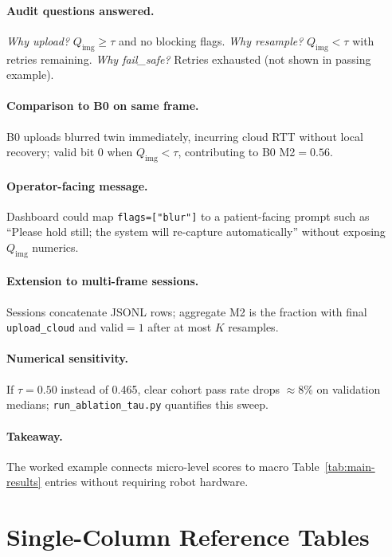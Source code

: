 \paragraph{Audit questions answered.}
\textit{Why upload?} $Q_{\mathrm{img}}\geq\tau$ and no blocking flags.
\textit{Why resample?} $Q_{\mathrm{img}}<\tau$ with retries remaining.
\textit{Why fail\_safe?} Retries exhausted (not shown in passing example).

\paragraph{Comparison to B0 on same frame.}
B0 uploads blurred twin immediately, incurring cloud RTT without local recovery; valid bit 0 when $Q_{\mathrm{img}}<\tau$, contributing to B0 M2$=0.56$.

\paragraph{Operator-facing message.}
Dashboard could map \texttt{flags=["blur"]} to a patient-facing prompt such as ``Please hold still; the system will re-capture automatically'' without exposing $Q_{\mathrm{img}}$ numerics.

\paragraph{Extension to multi-frame sessions.}
Sessions concatenate JSONL rows; aggregate M2 is the fraction with final \texttt{upload\_cloud} and valid$=1$ after at most $K$ resamples.

\paragraph{Numerical sensitivity.}
If $\tau{=}0.50$ instead of 0.465, clear cohort pass rate drops $\approx$8\% on validation medians; \texttt{run\_ablation\_tau.py} quantifies this sweep.

\paragraph{Takeaway.}
The worked example connects micro-level scores to macro Table~\ref{tab:main-results} entries without requiring robot hardware.

\onecolumn
\section{Single-Column Reference Tables}
\label{sec:onecol-tables}

